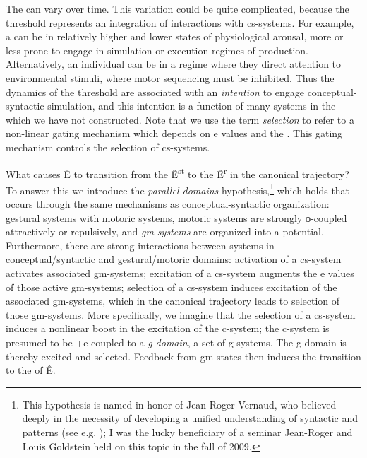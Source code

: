 The  can vary over time. This variation could be quite complicated, because the threshold represents an integration of  interactions with cs-systems. For example, a  can be in relatively higher and lower states of physiological arousal, more or less prone to engage in simulation or execution regimes of production. Alternatively, an individual can be in a regime where they direct attention to environmental stimuli, where motor sequencing must be inhibited. Thus the dynamics of the threshold are associated with an \textit{intention} to engage conceptual-syntactic simulation, and this intention is a function of many systems in the  which we have not constructed. Note that we use the term \textit{selection} to refer to a non-linear gating mechanism which depends on e values and the . This gating mechanism controls the selection of cs-systems.

 What causes Ê to transition from the  Ê\textsuperscript{st} to the  Ê\textsuperscript{r} in the canonical trajectory? To answer this we introduce the \textit{parallel domains} hypothesis,\footnote{This hypothesis is named in honor of Jean-Roger Vernaud, who believed deeply in the necessity of developing a unified understanding of syntactic and  patterns (see e.g. \citealt{FreidinVergnaud2001,Vergnaud1977}); I was the lucky beneficiary of a seminar Jean-Roger and Louis Goldstein held on this topic in the fall of 2009.} which holds that  occurs through the same mechanisms as conceptual-syntactic organization: gestural systems  with motoric systems, motoric systems are strongly ϕ-coupled attractively or repulsively, and \textit{gm-systems} are organized into a  potential. Furthermore, there are strong interactions between systems in conceptual/syntactic and gestural/motoric domains: activation of a cs-system activates associated gm-systems; excitation of a cs-system augments the e values of those active gm-systems; selection of a cs-system induces excitation of the associated gm-systems, which in the canonical trajectory leads to selection of those gm-systems. More specifically, we imagine that the selection of a cs-system induces a nonlinear boost in the excitation of the c-system; the c-system is presumed to be +e-coupled to a \textit{g-domain}, a set of g-systems. The g-domain is thereby excited and selected. Feedback from gm-states then induces the transition to the  of  Ê.

